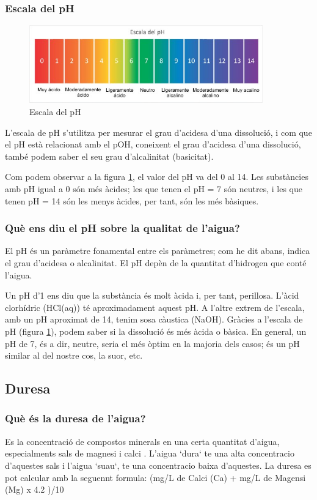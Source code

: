 \subsubsection{Escala del pH}
\begin{figure}[h!]
\centering
\includegraphics[width=0.9\textwidth]{./Figures/EscaladepH.png}
\caption{Escala del pH}
\label{fig:escaladeph}
\end{figure}
L'escala de pH s'utilitza per mesurar el grau d'acidesa d'una dissolució, i com que el pH està relacionat amb el pOH, coneixent el grau d'acidesa d'una dissolució, també podem saber el seu grau d'alcalinitat (basicitat).

Com podem observar a la figura \ref{fig:escaladeph}, el valor del pH va del 0 al 14. Les substàncies amb pH igual a 0 són més àcides; les que tenen el pH = 7 són neutres, i les que tenen pH = 14 són les menys àcides, per tant, són les més bàsiques.

\subsubsection{Què ens diu el pH sobre la qualitat de l'aigua?}
El pH és un paràmetre fonamental entre els paràmetres; com he dit abans, indica el grau d'acidesa o alcalinitat. El pH depèn de la quantitat d'hidrogen que conté l'aigua.

Un pH d'1 ens diu que la substància és molt àcida i, per tant, perillosa. L'àcid clorhídric (HCl(aq)) té aproximadament aquest pH. A l'altre extrem de l'escala, amb un pH aproximat de 14, tenim sosa càustica (NaOH). Gràcies a l'escala de pH (figura \ref{fig:escaladeph}), podem saber si la dissolució és més àcida o bàsica. En general, un pH de 7, és a dir, neutre, seria el més òptim en la majoria dels casos; és un pH similar al del nostre cos, la suor, etc.
\subsection{Duresa} \label{subsec:duresa}
\subsubsection{Què és la duresa de l'aigua?}
Es la concentració de compostos minerals en una certa quantitat d'aigua, especialments sals de magnesi i calci \cite{Facsa}. L'aigua `dura` te una alta concentracio d'aquestes sals i l'aigua `suau`, te una concentracio baixa d'aquestes. La duresa es pot calcular amb la seguennt formula: (mg/L de Calci (Ca) + mg/L de Magensi (Mg) x 4.2 )/10
